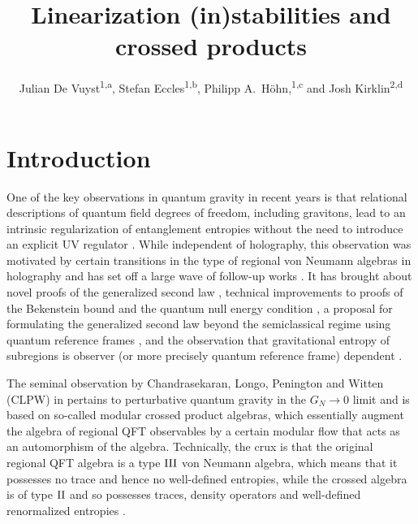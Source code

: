 \documentclass[]{jkpaper}
\title{Linearization \texorpdfstring{\textcolor{black!40!white}{(in)}}{(in)}stabilities and crossed products}
\author{Julian De Vuyst\texorpdfstring{\textsuperscript{1,a}}{}, Stefan Eccles\texorpdfstring{\textsuperscript{1,b}}{}, Philipp A.\ H\"ohn,\texorpdfstring{\textsuperscript{1,c}}{} and Josh Kirklin\texorpdfstring{\textsuperscript{2,d}}{}}
\theoremstyle{plain}
\theoremstyle{definition}
\begin{document}
\maketitleandtoc





\section{Introduction}






One of the key observations in quantum gravity in recent years is that relational descriptions of quantum field degrees of freedom, including gravitons, lead to an intrinsic regularization of entanglement entropies  without the need to introduce an explicit UV regulator \cite{Chandrasekaran:2022cip}. While independent of holography, this observation was motivated by certain transitions in the type of regional von Neumann algebras in holography \cite{leutheusser2023causal,leutheusser2023emergent,Witten:2021unn} and has set off a large wave of follow-up works \cite{Jensen:2023yxy,Witten:2023qsv,Witten:2023xze,Kudler-Flam:2023qfl,Kudler-Flam:2024psh,AliAhmad:2023etg,Aguilar-Gutierrez:2023odp,Chen:2024rpx,Gomez:2023upk,Gomez:2023wrq,Fewster:2024pur,Kaplan:2024xyk,AliAhmad:2024wja,AliAhmad:2024vdw,Kolchmeyer:2024fly}. It has brought about  novel proofs of the generalized second law \cite{Faulkner:2024gst}, technical improvements to proofs of the Bekenstein bound and the quantum null energy condition \cite{Kudler-Flam:2023hkl}, a proposal for formulating the generalized second law beyond the semiclassical regime using quantum reference frames \cite{KirklinGSL}, and the observation that gravitational entropy of subregions is observer (or more precisely quantum reference frame) dependent \cite{DeVuyst:2024pop,DVEHK}. 

The seminal observation by Chandrasekaran, Longo, Penington and Witten (CLPW) in \cite{Chandrasekaran:2022cip} pertains to perturbative quantum gravity in the $G_N\to0$ limit and is based on so-called modular crossed product algebras, which essentially augment the algebra of regional QFT observables by a certain modular flow that acts as an automorphism of the algebra. Technically, the crux is that the original regional QFT algebra is a type $\rm{III}$ von Neumann algebra, which means that it possesses no trace and hence no well-defined entropies, while the crossed algebra is of type $\rm{II}$ and so possesses traces, density operators and well-defined renormalized entropies \cite{Takesaki1979,Sorce:2023fdx,Witten:2021unn}.
\end{document}
